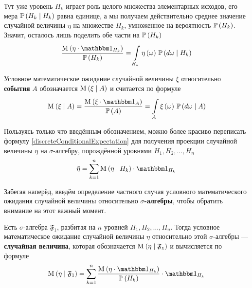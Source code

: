 Тут уже уровень $H_k$ играет роль целого множества элементарных исходов,
его мера $\mathbb{P}\left( H_k \mid H_k \right)$ равна единице,
а мы получаем действительно среднее значение случайной величины $\eta$
на множестве $H_k$, умноженное на вероятность $\mathbb{P}\left( H_k \right)$.
Значит, осталось лишь поделить обе части на $\mathbb{P}\left( H_k \right)$
$$\frac{\mean{\left( \eta \cdot \indicatorof{H_k} \right)}}{\probability{H_k}}
        = \integrall{H_k}{\probability{d\omega \mid H_k}}{
            \eta\left( \omega \right)}$$

\begin{definition}
Условное математическое
ожидание случайной величины $\xi$
относительно \textbf{события} $A$ \cite[стр.~68]{BorovkovPT}
обозначается $\mathrm{M}_{} \left( \xi \mid A \right)$ и считается по формуле
$$\mean{\left( \xi \mid A \right)}
    = \frac{\mean{\left( \xi \cdot \indicatorof{A} \right)}}{\probability{A}}
        = \integrall{A}{\probability{d\omega \mid A}}{
            \xi\left( \omega \right)}$$
\end{definition}

Пользуясь только что введённым обозначением,
можно более красиво переписать формулу \eqref{discreteConditionalExpectation}
для получения проекции случайной величины $\eta$ на $\sigma$-алгебру,
порождённой уровнями $H_1, H_2, \dots, H_n$ 
$$\tilde{\eta}
    = \sum_{k=1}^n \mean{\left( \eta \mid H_k \right)} \cdot \indicatorof{H_k}$$

Забегая наперёд,
введём определение частного случая условного математического ожидания
случайной величины относительно \textbf{$\sigma$-алгебры},
чтобы обратить внимание на этот важный момент.

\begin{definition}
    Есть $\sigma$-алгебра $\mathfrak{F}_1$,
    разбитая на $n$ уровней $H_1, H_2, \dots, H_n$.
    Тогда условное математическое ожидание случайной величины
    $\eta$ относительно этой $\sigma$-алгебры --- \textbf{случайная величина},
    которая обозначается $\mathrm{M}_{} \left( \eta \mid \mathfrak{F_1} \right)$
    и вычисляется по формуле
    $$\mean{\left( \eta \mid \mathfrak{F}_1 \right)}
        = \sum_{k=1}^n
            \frac{\mean{\left( \eta \cdot \indicatorof{H_k} \right)}}
                {\probability{H_k}}
            \cdot \indicatorof{H_k}$$
\end{definition}


